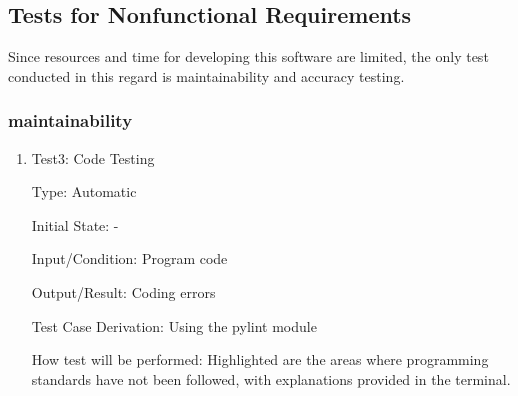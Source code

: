\documentclass[12pt, titlepage]{article}
\begin{document}
\subsection{Tests for Nonfunctional Requirements}
Since resources and time for developing this software are limited, the only test conducted in this regard is maintainability and accuracy testing. 

\subsubsection{maintainability}
		

\begin{enumerate}

\item{Test3: Code Testing\\}

Type: Automatic
					
Initial State: -
					
Input/Condition: Program code
					
Output/Result: Coding errors

Test Case Derivation: Using the pylint module
					
How test will be performed:  Highlighted are the areas where programming standards have not been followed, with explanations provided in the terminal.
\end{enumerate}
\end{document}
